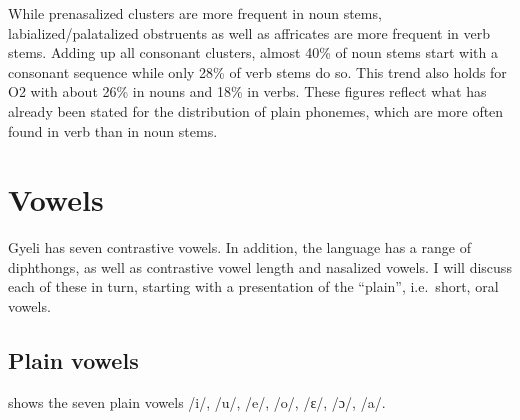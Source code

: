 While prenasalized clusters are more frequent in noun stems, labialized{\slash}palat\-al\-ized obstruents as well as affricates are more frequent in verb stems. Adding up all consonant clusters, almost 40\% of noun stems start with a consonant sequence while only 28\% of verb stems do so. This trend also holds for O2 with about 26\% in nouns and 18\% in verbs. These figures reflect what has already been stated for the distribution of plain phonemes, which are more often found in verb than in noun stems.





\section{Vowels}
\label{sec:Vowels}

Gyeli has seven contrastive vowels. In addition, the language has a range of diphthongs, as well as contrastive vowel length and nasalized vowels. I will discuss each of these in turn, starting with a presentation of the ``plain'', i.e.\ short, oral vowels.

\subsection{Plain vowels}
\label{sec:CardVowels}

  shows the seven plain vowels /i/, /u/, /e/, /o/, /ɛ/, /ɔ/, /a/.

